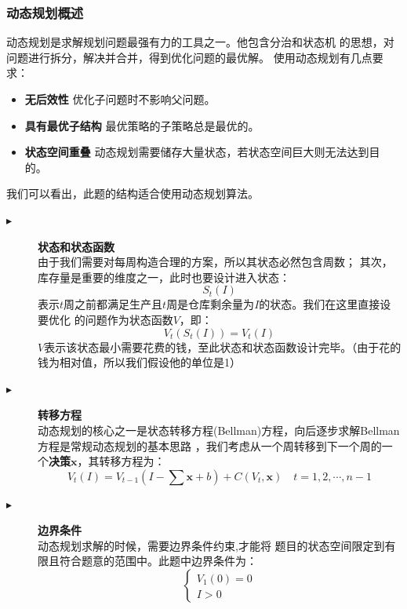 \documentclass{cumcmthesis}
\begin{document}
\subsubsection*{动态规划概述}
动态规划是求解规划问题最强有力的工具之一。他包含分治和状态机
的思想，对问题进行拆分，解决并合并，得到优化问题的最优解。
使用动态规划有几点要求：
\begin{itemize}
    \item \textbf{无后效性} \quad 优化子问题时不影响父问题。
    \item \textbf{具有最优子结构} \quad 最优策略的子策略总是最优的。
    \item \textbf{状态空间重叠} \quad 动态规划需要储存大量状态，若状态空间巨大则无法达到目的。
\end{itemize}
我们可以看出，此题的结构适合使用动态规划算法。\par
\begin{description}
    \item[$\blacktriangleright$] \textbf{状态和状态函数} \\
        由于我们需要对每周构造合理的方案，所以其状态必然包含周数；
        其次，库存量是重要的维度之一，此时也要设计进入状态：
        $$
            S_t(I)
        $$
        表示$t$周之前都满足生产且$t$周是仓库剩余量为$I$的状态。我们在这里直接设要优化
        的问题作为状态函数$V$，即：
        $$
            V_t(S_t(I)) = V_t(I)
        $$
        $V$表示该状态最小需要花费的钱，至此状态和状态函数设计完毕。（由于花的钱为相对值，所以我们假设他的单位是1）
    \item[$\blacktriangleright$] \textbf{转移方程} \\
        动态规划的核心之一是状态转移方程(Bellman)方程，向后逐步求解Bellman方程是常规动态规划的基本思路
        ，我们考虑从一个周转移到下一个周的一个\textbf{决策}$\bm{x}$，其转移方程为：
        \begin{equation}
            V_t(I) = V_{t-1}(I - \sum \bm{x} + b) + C(V_t,\bm{x}) \quad t = 1,2,\cdots , n-1
            \label{状态转移方程}
        \end{equation}
    \item[$\blacktriangleright$] \textbf{边界条件} \\
        动态规划求解的时候，需要边界条件约束,才能将
        题目的状态空间限定到有限且符合题意的范围中。此题中边界条件为：
        $$
            \left\{
            \begin{aligned}
                V_1(0) = 0 \\
                I > 0
            \end{aligned}
            \right.
        $$
\end{description}
\end{document}
